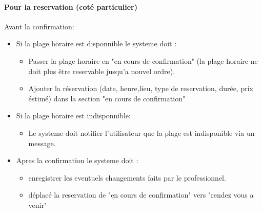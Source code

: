 \documentclass{article}
\begin{document}
\paragraph{Pour la reservation (coté particulier)}
Avant la confirmation:
	\begin{itemize}
	\item Si la plage horaire est disponnible le systeme doit :
		\begin{itemize}
		\item Passer la plage horaire en "en cours de confirmation" 
			(la plage horaire ne doit plus être reservable jusqu'a nouvel ordre).
		\item Ajouter la réservation (date, heure,lieu, type de reservation, durée, prix éstimé) dans la section "en cours de confirmation"
		\end{itemize}
	\item Si la plage horaire est indisponnible:
		\begin{itemize}
		\item Le systeme doit notifier l'utilisateur que la plage est indisponible via un message.
		\end{itemize}
	\item Apres la confirmation le systeme doit :
		\begin{itemize}
		\item enregistrer les eventuels changements faits par le professionnel.
		\item déplacé la reservation de "en cours de confirmation" vers "rendez vous a venir"


		\end{itemize}
	\end{itemize}
\end{document}
